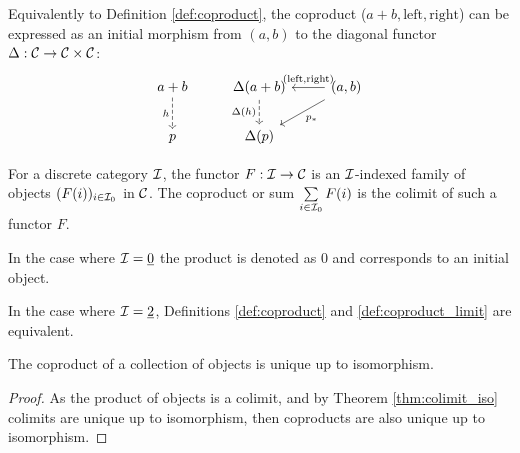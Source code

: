 \begin{definition}
	Equivalently to Definition \ref{def:coproduct}, the coproduct ($a+b,
	\mathrm{left}, \mathrm{right}$) can be expressed as an initial morphism from
	$(a,b)$ to the diagonal functor $\Delta: \mathcal{C} \to \mathcal{C}\times \mathcal{C}$:
	\[\begin{tikzcd}[ampersand replacement=\&]
		{a+b} \& {\Delta(a+b)} \& {(a,b)} \\
		p \& {\Delta(p)}
		\arrow["h"', dashed, from=1-1, to=2-1]
		\arrow["{\Delta(h)}"', dashed, from=1-2, to=2-2]
		\arrow["{(\mathrm{left}, \mathrm{right})}"', from=1-3, to=1-2]
		\arrow["{p_*}", from=1-3, to=2-2]
	\end{tikzcd}\]
\end{definition}

\begin{definition}
	For a discrete category $\mathcal{I}$, the functor $F:\mathcal{I}\to \mathcal{C}$ is an $\mathcal{I}$-indexed
	family of objects $(F(i))_{i\in \mathcal{I}_0}$ in $\mathcal{C}$. The coproduct or sum
	$\sum\limits_{i\in \mathcal{I}_0} F(i)$ is the colimit of such a functor $F$.
	\parencite{leinster:basic_category_theory}
\end{definition}

\begin{remark}
	In the case where $\mathcal{I}=\underline{0}$ the product is denoted as $0$ and
	corresponds to an initial object.
\end{remark}

\begin{remark}
	In the case where $\mathcal{I}=\underline{2}$, Definitions \ref{def:coproduct} and
	\ref{def:coproduct_limit} are equivalent.
\end{remark}

\begin{theorem}
	The coproduct of a collection of objects is unique up to isomorphism.

	\begin{proof}
		As the product of objects is a colimit, and by Theorem \ref{thm:colimit_iso}
		colimits are unique up to isomorphism, then coproducts are also unique up to
		isomorphism.
	\end{proof}
\end{theorem}